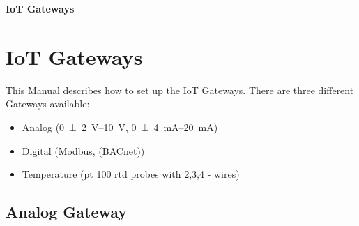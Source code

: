 \documentclass[10pt,letterpaper]{article}
\def\vo{\SIrange[range-phrase = --,range-units = single]{0(2)}{10}{\volt}}
\def\am{\SIrange[range-phrase = --,range-units = single]{0(4)}{20}{\milli\ampere}}
\begin{document}
\footnotesize

\begin{center}
  {\huge\sffamily\bfseries IoT Gateways} \huge\bfseries \\
\end{center}

	
	\section{IoT Gateways}
	This Manual describes how to set up the IoT Gateways. There are three different Gateways available:
	
	\begin{itemize}
		\item Analog (\vo, \am)
		\item Digital (Modbus, (BACnet))
		\item Temperature (pt 100 rtd probes with 2,3,4 - wires)
	\end{itemize}
	
	\subsection{Analog Gateway}
	
\end{document}
